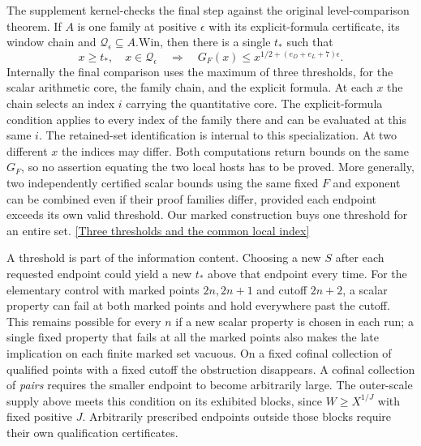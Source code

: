 \documentclass[12pt,letterpaper]{article}
\begin{document}
The supplement kernel-checks the final step against the original level-comparison theorem. If \(A\) is one family at positive \(\epsilon\) with its explicit-formula certificate, its window chain and \(\mathcal Q_\epsilon\subseteq A.\mathrm{Win}\), then there is a single \(t_*\) such that
\[
 x\ge t_*,\quad x\in\mathcal Q_\epsilon
 \quad\Longrightarrow\quad
 G_F(x)\le x^{1/2+(e_D+e_L+7)\epsilon}.
\]
Internally the final comparison uses the maximum of three thresholds, for the scalar arithmetic core, the family chain, and the explicit formula. At each \(x\) the chain selects an index \(i\) carrying the quantitative core. The explicit-formula condition applies to every index of the family there and can be evaluated at this same \(i\). The retained-set identification is internal to this specialization. At two different \(x\) the indices may differ. Both computations return bounds on the same \(G_F\), so no assertion equating the two local hosts has to be proved. More generally, two independently certified scalar bounds using the same fixed \(F\) and exponent can be combined even if their proof families differ, provided each endpoint exceeds its own valid threshold. Our marked construction buys one threshold for an entire set.
\href{https://github.com/nousentllc/riemann-hypothesis/blob/40e56bab026552e089d7afcfeff08d2defb9c005/src/Development/AutomorphicArithmetic/PrimitiveCosets/WindowInequalityOfArtinInputs.lean#L17-L25}{[Three thresholds and the common local index]}

A threshold is part of the information content. Choosing a new \(S\) after each requested endpoint could yield a new \(t_*\) above that endpoint every time. For the elementary control with marked points \(2n,2n+1\) and cutoff \(2n+2\), a scalar property can fail at both marked points and hold everywhere past the cutoff. This remains possible for every \(n\) if a new scalar property is chosen in each run; a single fixed property that fails at all the marked points also makes the late implication on each finite marked set vacuous. On a fixed cofinal collection of qualified points with a fixed cutoff the obstruction disappears. A cofinal collection of \emph{pairs} requires the smaller endpoint to become arbitrarily large. The outer-scale supply above meets this condition on its exhibited blocks, since \(W\ge X^{1/J}\) with fixed positive \(J\). Arbitrarily prescribed endpoints outside those blocks require their own qualification certificates.
\end{document}
